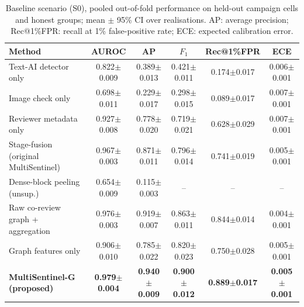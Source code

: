 \documentclass[pdflatex,sn-basic]{sn-jnl}
\theoremstyle{thmstyleone}
\theoremstyle{thmstylethree}
\begin{document}
\begin{table}[t]
\caption{Baseline scenario (S0), pooled out-of-fold performance on held-out campaign cells and honest groups; mean $\pm$ 95\% CI over realisations. AP: average precision; Rec@1\%FPR: recall at 1\% false-positive rate; ECE: expected calibration error.}\label{tab:main}
\scriptsize\setlength{\tabcolsep}{1pt}
\begin{tabular}{@{}lccccc@{}}
\toprule
Method & AUROC & AP & $F_1$ & Rec@1\%FPR & ECE \\
\midrule
Text-AI detector only & 0.822$\pm$0.009 & 0.389$\pm$0.013 & 0.421$\pm$0.011 & 0.174$\pm$0.017 & 0.006$\pm$0.001 \\
Image check only & 0.698$\pm$0.011 & 0.229$\pm$0.017 & 0.298$\pm$0.015 & 0.089$\pm$0.017 & 0.007$\pm$0.001 \\
Reviewer metadata only & 0.927$\pm$0.008 & 0.778$\pm$0.020 & 0.719$\pm$0.021 & 0.628$\pm$0.029 & 0.007$\pm$0.001 \\
Stage-fusion (original MultiSentinel) & 0.967$\pm$0.003 & 0.871$\pm$0.011 & 0.796$\pm$0.014 & 0.741$\pm$0.019 & 0.005$\pm$0.001 \\
Dense-block peeling (unsup.) & 0.654$\pm$0.009 & 0.115$\pm$0.003 & -- & -- & -- \\
Raw co-review graph + aggregation & 0.976$\pm$0.003 & 0.919$\pm$0.007 & 0.863$\pm$0.011 & 0.844$\pm$0.014 & 0.004$\pm$0.001 \\
Graph features only & 0.906$\pm$0.010 & 0.785$\pm$0.022 & 0.820$\pm$0.023 & 0.750$\pm$0.028 & 0.005$\pm$0.001 \\
\textbf{MultiSentinel-G (proposed)} & \textbf{0.979$\pm$0.004} & \textbf{0.940$\pm$0.009} & \textbf{0.900$\pm$0.012} & \textbf{0.889$\pm$0.017} & \textbf{0.005$\pm$0.001} \\
\bottomrule
\end{tabular}
\end{table}
\end{document}
